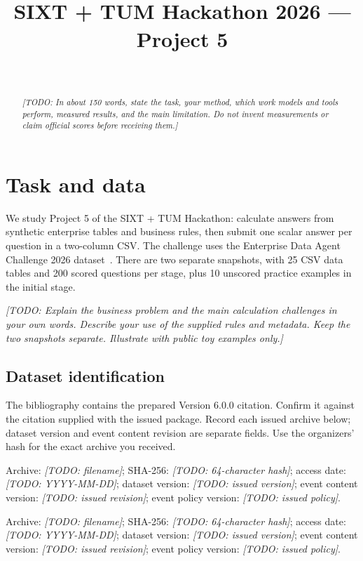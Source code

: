 \documentclass[11pt,a4paper]{article}
\title{\todo{Your method title}\\
  \large SIXT + TUM Hackathon 2026 --- Project 5}
\author{\todo{Student author names}\\
  \small \todo{Actual affiliations and contact email}}
\date{\todo{Manuscript date}}
\newcommand{\todo}[1]{\textit{[TODO: #1]}}
\begin{document}
\maketitle

\begin{abstract}
\todo{In about 150 words, state the task, your method, which work models and
tools perform, measured results, and the main limitation. Do not invent
measurements or claim official scores before receiving them.}
\end{abstract}

\section{Task and data}
We study Project 5 of the SIXT + TUM Hackathon: calculate answers from
synthetic enterprise tables and business rules, then submit one scalar answer
per question in a two-column CSV. The challenge uses the Enterprise Data Agent
Challenge 2026 dataset~\cite{tzachristas2026enterprise}. There are two separate
snapshots, with 25 CSV data tables and 200 scored questions per stage, plus
10 unscored practice examples in the initial stage.

\todo{Explain the business problem and the main calculation challenges in your
own words. Describe your use of the supplied rules and metadata. Keep the two
snapshots separate. Illustrate with public toy examples only.}

\subsection{Dataset identification}
The bibliography contains the prepared Version 6.0.0 citation. Confirm it
against the citation supplied with the issued package. Record each issued
archive below; dataset version and event content revision are separate fields.
Use the organizers' hash for the exact archive you received.

\begin{description}[style=nextline]
  \item[Initial/public stage]
    Archive: \todo{filename}; SHA-256: \todo{64-character hash};
    access date: \todo{YYYY-MM-DD}; dataset version: \todo{issued version};
    event content version: \todo{issued revision};
    event policy version: \todo{issued policy}.
  \item[Final stage]
    Archive: \todo{filename}; SHA-256: \todo{64-character hash};
    access date: \todo{YYYY-MM-DD}; dataset version: \todo{issued version};
    event content version: \todo{issued revision};
    event policy version: \todo{issued policy}.
\end{description}
\end{document}
